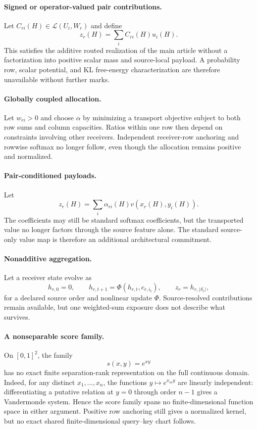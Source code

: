 \paragraph{Signed or operator-valued pair contributions.}
Let $C_{ri}(H)\in\mathcal L(U_i,W_r)$ and define
\[
z_r(H)=\sum_i C_{ri}(H)u_i(H).
\]
This satisfies the additive routed realization of the main article without a factorization into positive scalar mass and source-local payload. A probability row, scalar potential, and KL free-energy characterization are therefore unavailable without further marks.

\paragraph{Globally coupled allocation.}
Let $w_{ri}>0$ and choose $\alpha$ by minimizing a transport objective subject to both row sums and column capacities. Ratios within one row then depend on constraints involving other receivers. Independent receiver-row anchoring and rowwise softmax no longer follow, even though the allocation remains positive and normalized.

\paragraph{Pair-conditioned payloads.}
Let
\[
z_r(H)=\sum_i\alpha_{ri}(H)v(x_r(H),y_i(H)).
\]
The coefficients may still be standard softmax coefficients, but the transported value no longer factors through the source feature alone. The standard source-only value map is therefore an additional architectural commitment.

\paragraph{Nonadditive aggregation.}
Let a receiver state evolve as
\[
h_{r,0}=0,
\qquad
h_{r,t+1}=\Phi(h_{r,t},c_{r,i_t}),
\qquad
z_r=h_{r,|S_r|},
\]
for a declared source order and nonlinear update $\Phi$. Source-resolved contributions remain available, but one weighted-sum exposure does not describe what survives.

\paragraph{A nonseparable score family.}
On $[0,1]^2$, the family
\[
s(x,y)=e^{xy}
\]
has no exact finite separation-rank representation on the full continuous domain. Indeed, for any distinct $x_1,\ldots,x_n$, the functions $y\mapsto e^{x_my}$ are linearly independent: differentiating a putative relation at $y=0$ through order $n-1$ gives a Vandermonde system. Hence the score family spans no finite-dimensional function space in either argument. Positive row anchoring still gives a normalized kernel, but no exact shared finite-dimensional query--key chart follows.


